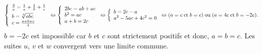 {{$$
\left\{
\begin{array}{l}
\frac{3}{a}=\frac{1}{a}+\frac{1}{b}+\frac{1}{c}\\
\rule{0mm}{5mm}b=\sqrt[3]{abc}\\
c=\frac{a+b+c}{3}
\end{array}
\right.
\Leftrightarrow
\left\{
\begin{array}{l}
2bc=ab+ac\\
b^2=ac\\
a+b=2c
\end{array}
\right.
\Leftrightarrow
\left\{
\begin{array}{l}
b=2c-a\\
a^2-5ac+4c^2=0\\
\end{array}
\right.
\Leftrightarrow(a=c\;\mbox{et}\;b=c)\;\mbox{ou}\;(a=4c\;\mbox{et}\;b=-2c).$$
$b=-2c$ est impossible car $b$ et $c$ sont strictement positifs et donc, $a=b=c$.
Les suites $u$, $v$ et $w$ convergent vers une limite commune.}
}